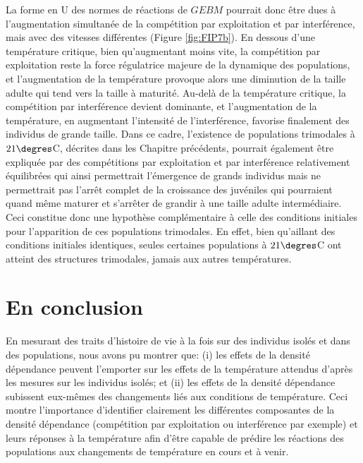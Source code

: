 La forme en U des normes de réactions de $GEBM$ pourrait donc être dues à
l'augmentation simultanée de la compétition par exploitation et par
interférence, mais avec des vitesses différentes (Figure \ref{fig:FIP7b}). En
dessous d'une température critique, bien qu'augmentant moins vite, la
compétition par exploitation reste la force régulatrice majeure de la dynamique
des populations, et l'augmentation de la température provoque alors une
diminution de la taille adulte qui tend vers la taille à maturité. Au-delà de la
température critique, la compétition par interférence devient dominante, et
l'augmentation de la température, en augmentant l'intensité de l'interférence,
favorise finalement des individus de grande taille. Dans ce cadre, l'existence
de populations trimodales à $21\degres$C, décrites dans les Chapitre précédents,
pourrait également être expliquée par des compétitions par exploitation et par
interférence relativement équilibrées qui ainsi permettrait l'émergence de
grands individus mais ne permettrait pas l'arrêt complet de la croissance des
juvéniles qui pourraient quand même maturer et s'arrêter de grandir à une taille
adulte intermédiaire. Ceci constitue donc une hypothèse complémentaire à
celle des conditions initiales pour l'apparition de ces populations trimodales.
En effet, bien qu'aillant des conditions initiales identiques, seules certaines
populations à $21\degres$C ont atteint des structures trimodales, jamais aux
autres températures. 

\section{En conclusion}

En mesurant des traits d'histoire de vie à la fois sur des individus isolés et
dans des populations, nous avons pu montrer que: (i) les effets de la densité
dépendance peuvent l'emporter sur les effets de la température attendus d'après
les mesures sur les individus isolés; et (ii) les effets de la densité
dépendance subissent eux-mêmes des changements liés aux conditions de
température. Ceci montre l'importance d'identifier clairement les différentes
composantes de la densité dépendance (compétition par exploitation ou
interférence par exemple) et leurs réponses à la température afin d'être capable
de prédire les réactions des populations aux changements de température en cours
et à venir. 
